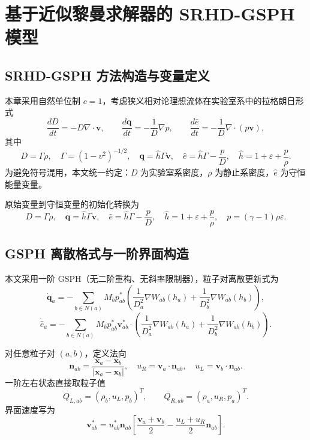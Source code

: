 \chapter{基于近似黎曼求解器的 SRHD-GSPH 模型}

\section{SRHD-GSPH 方法构造与变量定义}

本章采用自然单位制 $c=1$，考虑狭义相对论理想流体在实验室系中的拉格朗日形式
\begin{equation}
\frac{dD}{dt}=-D\nabla\cdot\boldsymbol{v},\qquad
\frac{d\boldsymbol{q}}{dt}=-\frac{1}{D}\nabla p,\qquad
\frac{d\hat{e}}{dt}=-\frac{1}{D}\nabla\cdot(p\boldsymbol{v}),
\end{equation}
其中
\begin{equation}
D=\Gamma\rho,\quad
\Gamma=(1-v^2)^{-1/2},\quad
\boldsymbol{q}=\hat{h}\Gamma\boldsymbol{v},\quad
\hat{e}=\hat{h}\Gamma-\frac{p}{D},\quad
\hat{h}=1+\varepsilon+\frac{p}{\rho}.
\end{equation}
为避免符号混用，本文统一约定：$D$ 为实验室系密度，$\rho$ 为静止系密度，$\hat{e}$ 为守恒能量变量。

原始变量到守恒变量的初始化转换为
\begin{equation}
D=\Gamma\rho,\quad
\boldsymbol{q}=\hat{h}\Gamma\boldsymbol{v},\quad
\hat{e}=\hat{h}\Gamma-\frac{p}{D},\quad
\hat{h}=1+\varepsilon+\frac{p}{\rho},\quad
p=(\gamma-1)\rho\varepsilon.
\end{equation}

\section{GSPH 离散格式与一阶界面构造}

本文采用一阶 GSPH（无二阶重构、无斜率限制器），粒子对离散更新式为
\begin{equation}
\dot{\boldsymbol{q}}_a
=-\sum_{b\in N(a)}M_b p_{ab}^{*}
\left(\frac{1}{D_a^2}\nabla W_{ab}(h_a)+\frac{1}{D_b^2}\nabla W_{ab}(h_b)\right),
\end{equation}
\begin{equation}
\dot{\hat{e}}_a
=-\sum_{b\in N(a)}M_b p_{ab}^{*}\boldsymbol{v}_{ab}^{*}\!\cdot\!
\left(\frac{1}{D_a^2}\nabla W_{ab}(h_a)+\frac{1}{D_b^2}\nabla W_{ab}(h_b)\right).
\end{equation}

对任意粒子对 $(a,b)$，定义法向
\begin{equation}
\boldsymbol{n}_{ab}=\frac{\boldsymbol{x}_a-\boldsymbol{x}_b}{|\boldsymbol{x}_a-\boldsymbol{x}_b|},\quad
u_R=\boldsymbol{v}_a\cdot\boldsymbol{n}_{ab},\quad
u_L=\boldsymbol{v}_b\cdot\boldsymbol{n}_{ab}.
\end{equation}
一阶左右状态直接取粒子值
\begin{equation}
Q_{L,ab}=(\rho_b,u_L,p_b)^T,\qquad
Q_{R,ab}=(\rho_a,u_R,p_a)^T.
\end{equation}
界面速度写为
\begin{equation}
\boldsymbol{v}_{ab}^{*}
=u_{ab}^{*}\boldsymbol{n}_{ab}
\left[\frac{\boldsymbol{v}_a+\boldsymbol{v}_b}{2}
-\frac{u_L+u_R}{2}\boldsymbol{n}_{ab}\right].
\end{equation}

